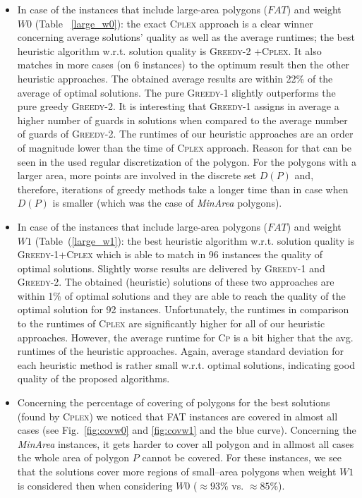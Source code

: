 \documentclass[runningheads,a4paper]{elsarticle}
\begin{document}
\begin{itemize}
     	\item In case of the instances that include large-area polygons ($FAT$) and weight $W0$ (Table~ \ref{large_w0}): the exact \textsc{Cplex} approach is a clear winner concerning average solutions' quality as well as the average runtimes;  the best heuristic algorithm w.r.t. solution quality is \textsc{Greedy-2 +Cplex}. It also matches in more cases (on 6 instances) to the optimum result then the other heuristic approaches. The obtained average results are within 22\% of the average of  optimal solutions.  The pure \textsc{Greedy-1} slightly outperforms the pure greedy \textsc{Greedy-2}. It is interesting that \textsc{Greedy-1} assigns in average a  higher number of guards in solutions when compared to the average number of guards of \textsc{Greedy-2}. The runtimes of our heuristic approaches are an order of magnitude lower than the time of \textsc{Cplex} approach. Reason for that can be seen in the used regular discretization of the polygon. For the polygons with a larger area, more points are involved in the discrete set $D(P)$ and, therefore, iterations of greedy methods take a longer time than in case when $D(P)$ is smaller (which was the case of \emph{MinArea} polygons).
     	\item  In case of the instances that include large-area polygons ($FAT$) and weight $W1$ (Table~(\ref{large_w1}): the best heuristic algorithm w.r.t. solution quality is \textsc{Greedy-1+Cplex} which is able to match in 96 instances the quality of optimal solutions. Slightly worse results are delivered by \textsc{Greedy-1} and \textsc{Greedy-2}. The obtained (heuristic) solutions of these two approaches are within 1\% of optimal solutions and they are
     	able to reach the quality of the optimal solution for 92 instances. Unfortunately, the runtimes in comparison to the runtimes of \textsc{Cplex} are significantly higher for all of our heuristic approaches. However, the average runtime for \textsc{Cp} is a bit higher that the avg. runtimes of the heuristic approaches. Again, average standard deviation for each heuristic method is rather small w.r.t. optimal solutions, indicating good quality of the proposed algorithms.
     	\item  Concerning the percentage of covering of polygons for the best solutions (found by \textsc{Cplex}) we
     	noticed that  \textsc{FAT} instances are covered in almost all cases (see Fig.~\ref{fig:covw0} and \ref{fig:covw1} and the blue curve). Concerning the \textit{MinArea} instances, it gets harder to cover all polygon and in allmost all cases the whole area of polygon $P$ cannot be covered. For these instances, we see that the solutions cover more regions of small--area polygons when weight $W1$ is considered then when considering $W0$ ($\approx 93 \%$ vs. $\approx 85\%$). %
     	
     \end{itemize}
\end{document}
